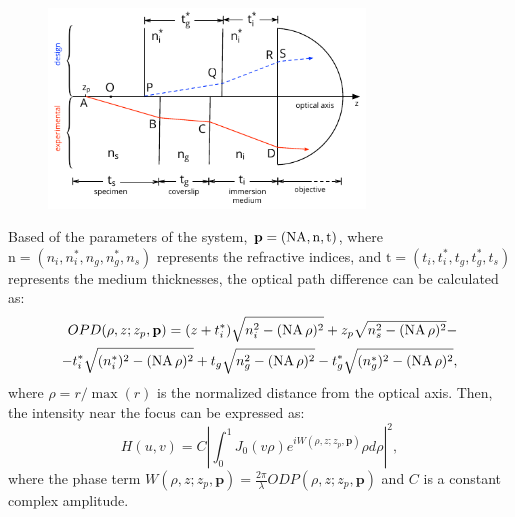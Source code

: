     \begin{figure}
      \centering
      \includegraphics[width=0.75\textwidth]{gibson-lanni}
      \label{fig:gibson-lanni}
    \end{figure}
    
    Based of the parameters of the system, $\mathbf{p}=(\operatorname{NA}, \mathrm{n}, \mathrm{t})$, where $\mathrm{n} = (n_i, n_i^*, n_g, n_g^*, n_s)$ represents the refractive indices, and $\mathrm{t} = (t_i, t_i^*, t_g, t_g^*, t_s)$ represents the medium thicknesses, the optical path difference can be calculated as:
    \begin{equation}
      \begin{split}
        OPD(\rho, z; z_p, \mathbf{p}) = (z+t_i^*) \sqrt{n_i^2-(\operatorname{NA} \rho)^2} + z_p \sqrt{n_s^2 - (\operatorname{NA} \rho)^2} - \\
        - t_i^* \sqrt{(n_i^*)^2 - (\operatorname{NA} \rho)^2} + t_g \sqrt{n_g^2 - (\operatorname{NA} \rho)^2} - t_g^* \sqrt{(n_g^*)^2 - (\operatorname{NA} \rho)^2},
      \end{split}      
      \label{eq:OPD}
    \end{equation}
    where $\rho = r / \max(r)$ is the normalized distance from the optical axis. Then, the intensity near the focus can be expressed as:
    \begin{equation}
      H(u,v) = C \left| \int_0^1 J_0 (v \rho )e^{iW(\rho, z; z_p, \mathbf{p})} \rho d \rho \right|^2,
      \label{eq:psf-gibson-lanni}
    \end{equation}
    where the phase term $W(\rho, z; z_p, \mathbf{p}) = \frac{2\pi}{\lambda} ODP(\rho, z; z_p, \mathbf{p})$ and $C$ is a constant complex amplitude.

